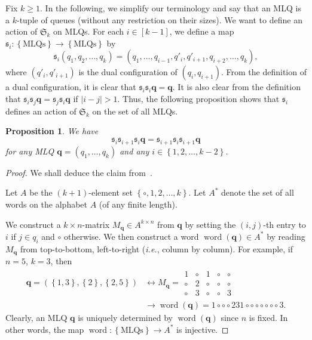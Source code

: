 \documentclass[reqno]{amsart}
\newcommand{\0}{\phantom{c}}
\newcommand{\SymGp}[1]{\mathfrak{S}_{#1}} %
\DeclareMathOperator{\word}{word} %
\newcommand{\qq}{\mathbf{q}}
\newcommand{\fraks}{\mathfrak{s}}
\newenvironment{verlong}{}{}
\newcommand{\set}[1]{\left\{ #1 \right\}}
\newcommand{\abs}[1]{\left| #1 \right|}
\newcommand{\tup}[1]{\left( #1 \right)}
\newcommand{\ive}[1]{\left[ #1 \right]}
\theoremstyle{plain}
\newtheorem{prop}[thm]{Proposition}
\theoremstyle{definition}
\numberwithin{equation}{section}
\begin{document}
\begin{verlong}
Fix $k \geq 1$.
In the following, we simplify our terminology and say that an MLQ
is a $k$-tuple of queues (without any restriction on their sizes).
We want to define an action of $\SymGp{k}$ on MLQs.
For each $i \in \ive{k-1}$, we define a map $\fraks_i \colon \set{\text{MLQs}} \to \set{\text{MLQs}}$ by
\[
\fraks_i(q_1, q_2, \dotsc, q_k) = (q_1, \dotsc, q_{i-1}, q'_i, q'_{i+1}, q_{i+2}, \dotsc, q_k),
\]
where $\tup{q'_i, q'_{i+1}}$ is the dual configuration of $\tup{q_i, q_{i+1}}$.
From the definition of a dual configuration, it is clear that $\fraks_i \fraks_i \qq = \qq$.
It is also clear from the definition that $\fraks_i \fraks_j \qq = \fraks_j \fraks_i \qq$ if $\abs{i - j} > 1$.
Thus, the following proposition shows that $\fraks_i$ defines an action of $\SymGp{k}$ on the set of all MLQs.

\begin{prop} \label{prop:braid-old6}
We have
\[
\fraks_i \fraks_{i+1} \fraks_i \qq
	   = \fraks_{i+1} \fraks_i \fraks_{i+1} \qq
\]
for any MLQ $\qq = \tup{q_1, \dotsc, q_k}$ and any $i \in \set{1, 2, \ldots, k-2}$.
\end{prop}

\begin{proof}
We shall deduce the claim from~\cite[Ch.~5, (5.6.3)]{Loth}.

Let $A$ be the $\tup{k+1}$-element set $\set{\circ, 1, 2, \ldots, k}$.
Let $A^*$ denote the set of all words on the alphabet $A$
(of any finite length).

We construct a $k \times n$-matrix $M_{\qq} \in A^{k \times n}$ from $\qq$ by setting the $\tup{i, j}$-th
entry to $i$ if $j \in q_i$ and $\circ$ otherwise.
We then construct a word $\word(\qq) \in A^*$ by reading $M_{\qq}$ from top-to-bottom, left-to-right (\textit{i.e.}, column by column).
For example, if $n = 5$, $k = 3$, then
\begin{align*}
\qq = \tup{\set{1, 3}, \set{2},
\set{2, 5}}
& \longleftrightarrow
 M_{\qq}
 =
 \begin{array}{ccccc}
  1 & \circ & 1 & \circ & \circ \\
  \circ & 2 & \circ  & \circ & \circ \\
  \circ & 3  & \circ & \circ & 3
 \end{array}
 \\ & \longrightarrow
 \word(\qq) = 1 \circ \circ \circ 2 3 1 \circ \circ \circ \circ \circ \circ \circ 3 .
\end{align*}
Clearly, an MLQ $\qq$ is uniquely determined by $\word(\qq)$ since $n$ is fixed.
In other words, the map $\word \colon \set{\text{MLQs}} \to A^*$
is injective.


\end{proof}
\end{verlong}
\end{document}
